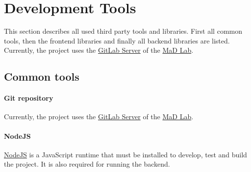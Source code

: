 \section{Development Tools}
\label{sec:development-tools}

This section describes all used third party tools and libraries.
First all common tools, then the frontend libraries and finally all backend libraries are listed.
Currently, the project uses the \href{https://mad-srv.informatik.uni-erlangen.de/}{GitLab Server} of the \href{https://www.mad.tf.fau.de/}{MaD Lab}.

\subsection{Common tools}

\paragraph{Git repository}
Currently, the project uses the \href{https://mad-srv.informatik.uni-erlangen.de/}{GitLab Server} of the \href{https://www.mad.tf.fau.de/}{MaD Lab}.

\paragraph{NodeJS}
\href{https://nodejs.org}{NodeJS} is a JavaScript runtime that must be installed to develop, test and build the project.
It is also required for running the backend.


